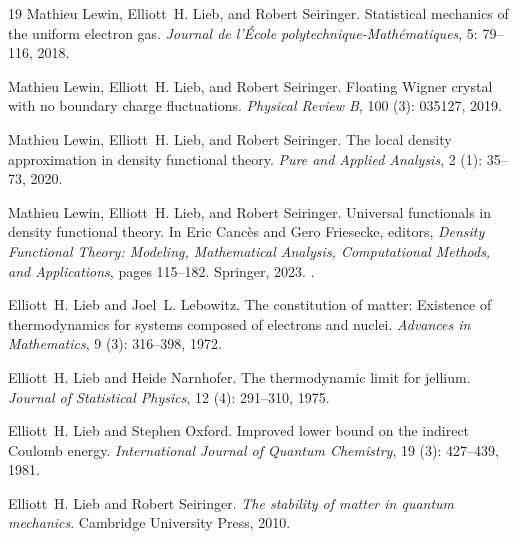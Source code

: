 \documentclass[final,reqno]{amsart}
\theoremstyle{remark}
\theoremstyle{definition}
\begin{document}
\begin{thebibliography}{19}
Mathieu Lewin, Elliott~H. Lieb, and Robert Seiringer.
\newblock Statistical mechanics of the uniform electron gas.
\newblock \emph{Journal de l’{\'E}cole polytechnique-Math{\'e}matiques},
  5: 79--116, 2018.

Mathieu Lewin, Elliott~H. Lieb, and Robert Seiringer.
\newblock Floating {W}igner crystal with no boundary charge fluctuations.
\newblock \emph{Physical Review B}, 100 (3): 035127, 2019.

Mathieu Lewin, Elliott~H. Lieb, and Robert Seiringer.
\newblock The local density approximation in density functional theory.
\newblock \emph{Pure and Applied Analysis}, 2 (1): 35--73,
  2020.

Mathieu Lewin, Elliott~H. Lieb, and Robert Seiringer.
\newblock Universal functionals in density functional theory.
\newblock In Eric Canc{\`e}s and Gero Friesecke, editors, \emph{Density
  Functional Theory: Modeling, Mathematical Analysis, Computational Methods,
  and Applications}, pages 115--182. Springer, 2023.
\newblock {}.

Elliott~H. Lieb and Joel~L. Lebowitz.
\newblock The constitution of matter: {E}xistence of thermodynamics for systems
  composed of electrons and nuclei.
\newblock \emph{Advances in Mathematics}, 9 (3): 316--398,
  1972.

Elliott~H. Lieb and Heide Narnhofer.
\newblock The thermodynamic limit for jellium.
\newblock \emph{Journal of Statistical Physics}, 12 (4):
  291--310, 1975.

Elliott~H. Lieb and Stephen Oxford.
\newblock Improved lower bound on the indirect {C}oulomb energy.
\newblock \emph{International Journal of Quantum Chemistry}, 19
  (3): 427--439, 1981.

Elliott~H. Lieb and Robert Seiringer.
\newblock \emph{The stability of matter in quantum mechanics}.
\newblock Cambridge University Press, 2010.


\end{thebibliography}
\end{document}
